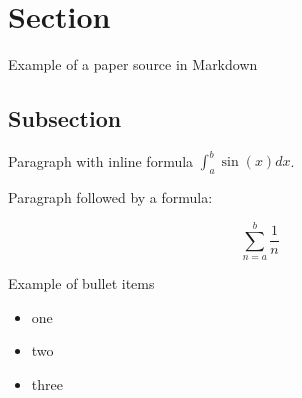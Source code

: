 \hypertarget{section}{%
\section{Section}\label{section}}

Example of a paper source in Markdown

\hypertarget{subsection}{%
\subsection{Subsection}\label{subsection}}

Paragraph with inline formula \(\int _a ^b \sin(x) dx\).

Paragraph followed by a formula:

\[\sum _{n=a} ^b \frac{1}{n}\]

Example of bullet items

\begin{itemize}
\tightlist
\item
  one
\item
  two
\item
  three
\end{itemize}
